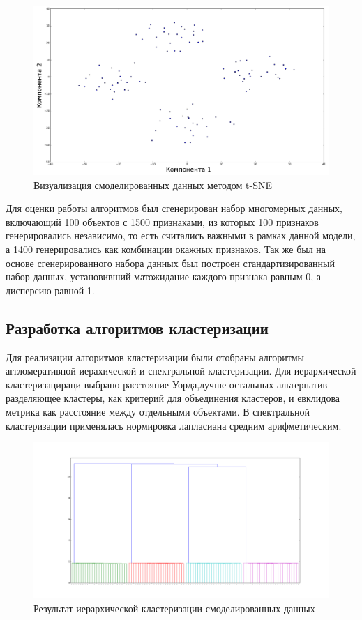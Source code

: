 \begin{figure}[H]
	\center
  \includegraphics[width=\linewidth]{pics/tsne_blob.png}
  \caption{Визуализация смоделированных данных методом t-SNE}
  \label{tsne_blob}
\end{figure}

Для оценки работы алгоритмов был сгенерирован набор многомерных данных, включающий 100 объектов с 1500 признаками, из которых 100 признаков генерировались независимо, то есть считались важными в рамках данной модели, а 1400 генерировались как комбинации окажных признаков. Так же был на основе сгенерированного набора данных был построен стандартизированный набор данных, установивший матожидание каждого признака равным 0, а дисперсию равной 1.

\subsection{Разработка алгоритмов кластеризации}
Для реализации алгоритмов кластеризации были отобраны алгоритмы аггломеративной иерахической и спектральной кластеризации. Для иерархической кластеризацираци выбрано расстояние Уорда,лучше остальных альтернатив разделяющее кластеры, как критерий для объединения кластеров, и евклидова метрика как расстояние между отдельными объектами. В спектральной кластеризации применялась нормировка лапласиана средним арифметическим.

\begin{figure}[H]
	\center
  \includegraphics[width=\linewidth]{pics/dendrogram_blob.png}
  \caption{Результат иерархической кластеризации смоделированных данных}
  \label{dendrogram_blob}
\end{figure}

